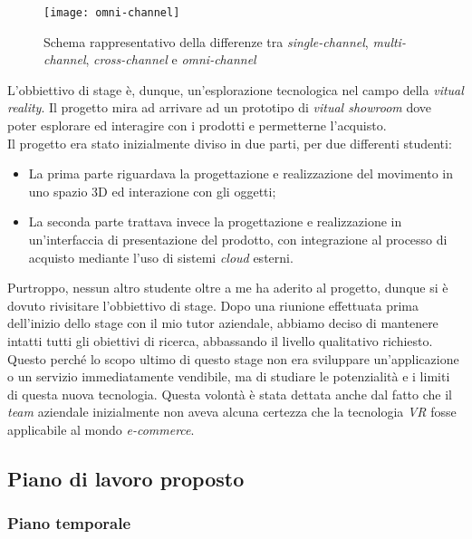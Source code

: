\label{Omni-channel}
\begin{figure}[ht]
	\begin{center}
		\texttt{[image: omni-channel]}
		\caption{Schema rappresentativo della differenze tra \textit{single-channel}, \textit{multi-channel}, \textit{cross-channel} e \textit{omni-channel}}
	\end{center}
\end{figure}
\FloatBarrier

L'obbiettivo di stage è, dunque, un'esplorazione tecnologica nel campo della \textit{vitual reality}. Il progetto mira ad arrivare ad un prototipo di \textit{vitual showroom} dove poter esplorare ed interagire con i prodotti e permetterne l'acquisto. \\
Il progetto era stato inizialmente diviso in due parti, per due differenti studenti:
\begin{itemize}
	\item La prima parte riguardava la progettazione e realizzazione del movimento in uno spazio 3D ed interazione con gli oggetti;
	\item La seconda parte trattava invece la progettazione e realizzazione in un'interfaccia di presentazione del prodotto, con integrazione al processo di acquisto mediante l'uso di sistemi \textit{cloud} esterni.
\end{itemize}
Purtroppo, nessun altro studente oltre a me ha aderito al progetto, dunque si è dovuto rivisitare l'obbiettivo di stage. Dopo una riunione effettuata prima dell'inizio dello stage con il mio tutor aziendale, abbiamo deciso di mantenere intatti tutti gli obiettivi di ricerca, abbassando il livello qualitativo richiesto. Questo perché lo scopo ultimo di questo stage non era sviluppare un'applicazione o un servizio immediatamente vendibile, ma di studiare le potenzialità e i limiti di questa nuova tecnologia. Questa volontà è stata dettata anche dal fatto che il \textit{team} aziendale inizialmente non aveva alcuna certezza che la tecnologia \textit{VR} fosse applicabile al mondo \textit{e-commerce}.

\subsection{Piano di lavoro proposto}

\subsubsection{Piano temporale}

